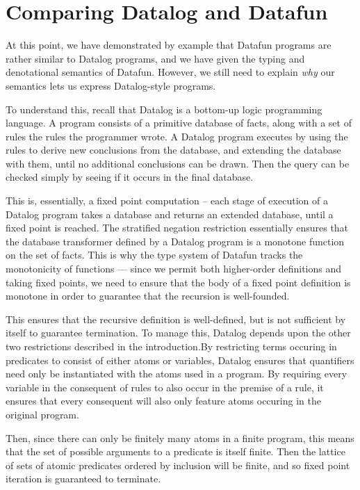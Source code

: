 \section{Comparing Datalog and Datafun}
\label{sec:datalog-vs-datafun}

At this point, we have
demonstrated by example that Datafun programs are rather similar to
Datalog programs, and we have given the typing and denotational
semantics of Datafun. However, we still need to explain \emph{why} our
semantics lets us express Datalog-style programs.

To understand this, recall that Datalog is a bottom-up logic
programming language. A program consists of a primitive database of
facts, along with a set of rules the rules the programmer wrote. A
Datalog program executes by using the rules to derive new conclusions
from the database, and extending the database with them, until no
additional conclusions can be drawn. Then the query can be checked
simply by seeing if it occurs in the final database.

This is, essentially, a fixed point computation -- each stage of
execution of a Datalog program takes a database and returns an
extended database, until a fixed point is reached. The stratified
negation restriction essentially ensures that the database transformer
defined by a Datalog program is a monotone function on the set of
facts. This is why the type system of Datafun tracks the monotonicity
of functions --- since we permit both higher-order definitions and
taking fixed points, we need to ensure that the body of a fixed point
definition is monotone in order to guarantee that the recursion is
well-founded.

This ensures that the recursive definition is well-defined, but is not
sufficient by itself to guarantee termination. To manage this, Datalog
depends upon the other two restrictions described in the
introduction.By restricting terms occuring in predicates to consist of
either atoms or variables, Datalog ensures that quantifiers need only
be instantiated with the atoms used in a program. By requiring every
variable in the consequent of rules to also occur in the premise of a
rule, it ensures that every consequent will also only feature atoms
occuring in the original program.

Then, since there can only be finitely many atoms in a finite program,
this means that the set of possible arguments to a predicate is itself
finite. Then the lattice of sets of atomic predicates ordered by
inclusion will be finite, and so fixed point iteration is guaranteed
to terminate.

